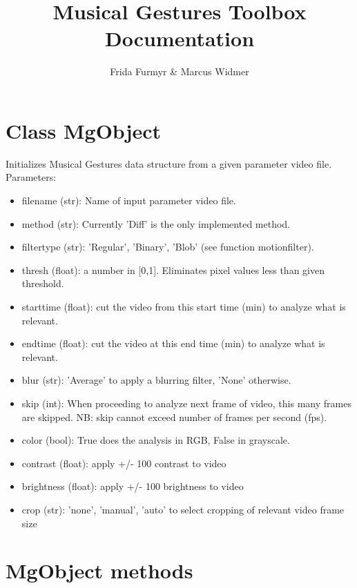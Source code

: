 \documentclass[9pt]{extarticle}
\title{Musical Gestures Toolbox\\ \large{Documentation}}
\author{Frida Furmyr \& Marcus Widmer}
\begin{document}
\maketitle

\tableofcontents

\section{Class MgObject}
    Initializes Musical Gestures data structure from a given parameter video file.\\

    \noindent Parameters:
    \begin{itemize}
   \item [] filename (str): Name of input parameter video file.
   \item [] method (str): Currently 'Diff' is the only implemented method. 
   \item [] filtertype (str): 'Regular', 'Binary', 'Blob' (see function motionfilter).
    \item [] thresh (float): a number in [0,1]. Eliminates pixel values less than given threshold.
   \item [] starttime (float): cut the video from this start time (min) to analyze what is relevant.
   \item [] endtime (float): cut the video at this end time (min) to analyze what is relevant.
   \item []  blur (str): 'Average' to apply a blurring filter, 'None' otherwise.
   \item[] skip (int): When proceeding to analyze next frame of video, this many frames are skipped. NB: skip cannot exceed number of frames per second (fps). 
    \item [] color (bool): True does the analysis in RGB, False in grayscale. 
    \item [] contrast (float): apply +/- 100 contrast to video
   \item []  brightness (float): apply +/- 100 brightness to video
    \item [] crop (str): 'none', 'manual', 'auto' to select cropping of relevant video frame size
    \end{itemize}
\section{MgObject methods}
\end{document}
